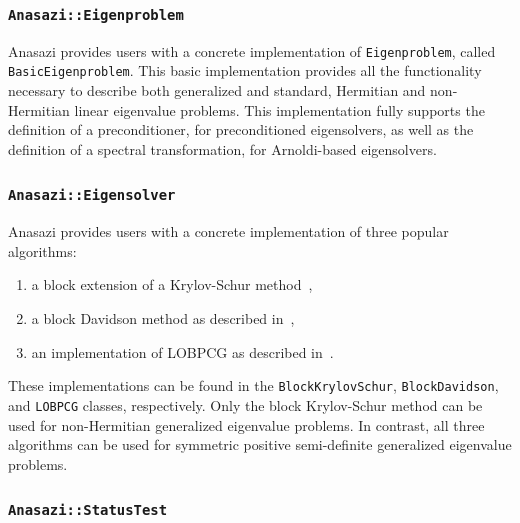 \documentclass[acmtoms]{acmtrans2m}
\newcounter{algorithm}
\newcommand{\aspace}[1]{\texttt{#1}}
\begin{document}
\subsubsection{\aspace{Anasazi::Eigenproblem}}

Anasazi provides users with a concrete implementation of
\aspace{Eigenproblem}, called \aspace{BasicEigenproblem}. This basic implementation
provides all the functionality necessary to describe both generalized and standard,
Hermitian and non-Hermitian linear eigenvalue problems. This implementation fully 
supports the definition of a preconditioner, for preconditioned eigensolvers, 
as well as the definition of a spectral transformation, for Arnoldi-based eigensolvers. 

\subsubsection{\aspace{Anasazi::Eigensolver}}

Anasazi provides users with a concrete implementation of three popular algorithms:
\begin{enumerate}
  \item a block extension of a Krylov-Schur method~\cite{stew:01},
  \item a block Davidson method as described in~\cite{Arbenz:2005:ACE},
  \item an implementation of LOBPCG as described in~\cite{Hetmaniuk:2006:BSL}.
\end{enumerate}
These implementations can be found in the \aspace{BlockKrylovSchur}, \aspace{BlockDavidson}, 
and \aspace{LOBPCG} classes, respectively. Only the block Krylov-Schur method can be used
for non-Hermitian generalized eigenvalue problems. In contrast, all three algorithms can 
be used for symmetric positive semi-definite generalized eigenvalue problems.

\subsubsection{\aspace{Anasazi::StatusTest}}

\end{document}
